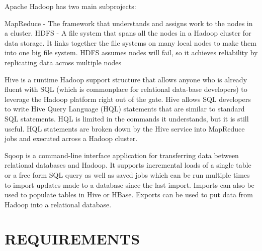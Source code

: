 \documentclass[a4paper,12pt,oneside]{sphinxmanual}
\begin{document}
Apache Hadoop has two main subprojects:

MapReduce - The framework that understands and assigns work to the nodes in a cluster.
HDFS - A file system that spans all the nodes in a Hadoop cluster for data storage. It links together the file systems on many local nodes to make them into one big file system. HDFS assumes nodes will fail, so it achieves reliability by replicating data across multiple nodes

Hive is a runtime Hadoop support structure that allows anyone who is already fluent with SQL (which is commonplace for relational data-base developers) to leverage the Hadoop platform right out of the gate.
Hive allows SQL developers to write Hive Query Language (HQL) statements that are similar to standard SQL statements. HQL is limited in the commands it understands, but it is still useful. HQL statements are broken down by the Hive service into MapReduce jobs and executed across a Hadoop cluster.

Sqoop is a command-line interface application for transferring data between relational databases and Hadoop. It supports incremental loads of a single table or a free form SQL query as well as saved jobs which can be run multiple times to import updates made to a database since the last import. Imports can also be used to populate tables in Hive or HBase. Exports can be used to put data from Hadoop into a relational database.


\chapter{REQUIREMENTS}
\label{document:requirements}
\end{document}
